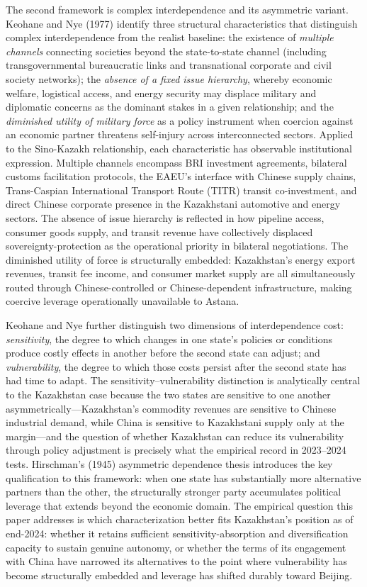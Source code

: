 \documentclass[12pt]{article}
\begin{document}
The second framework is complex interdependence and its asymmetric variant. Keohane and Nye (1977) identify three structural characteristics that distinguish complex interdependence from the realist baseline: the existence of \textit{multiple channels} connecting societies beyond the state-to-state channel (including transgovernmental bureaucratic links and transnational corporate and civil society networks); the \textit{absence of a fixed issue hierarchy}, whereby economic welfare, logistical access, and energy security may displace military and diplomatic concerns as the dominant stakes in a given relationship; and the \textit{diminished utility of military force} as a policy instrument when coercion against an economic partner threatens self-injury across interconnected sectors. Applied to the Sino-Kazakh relationship, each characteristic has observable institutional expression. Multiple channels encompass BRI investment agreements, bilateral customs facilitation protocols, the EAEU's interface with Chinese supply chains, Trans-Caspian International
Transport Route (TITR) transit co-investment, and direct Chinese corporate presence in the Kazakhstani automotive and energy sectors. The absence of issue hierarchy is reflected in how pipeline access, consumer goods supply, and transit revenue have collectively displaced sovereignty-protection as the operational priority in bilateral negotiations. The diminished utility of force is structurally embedded: Kazakhstan's energy export revenues, transit fee income, and consumer market supply are all simultaneously routed through Chinese-controlled or Chinese-dependent infrastructure, making coercive leverage operationally unavailable to Astana.

Keohane and Nye further distinguish two dimensions of interdependence cost: \textit{sensitivity}, the degree to which changes in one state's policies or conditions produce costly effects in another before the second state can adjust; and \textit{vulnerability}, the degree to which those costs persist after the second state has had time to adapt. The sensitivity--vulnerability distinction is analytically central to the Kazakhstan case because the two states are sensitive to one another asymmetrically---Kazakhstan's commodity revenues are sensitive to Chinese industrial demand, while China is sensitive to Kazakhstani supply only at the margin---and the question of whether Kazakhstan can reduce its vulnerability through policy adjustment is precisely what the empirical record in 2023--2024 tests. Hirschman's (1945) asymmetric dependence thesis introduces the key qualification to this framework: when one state has substantially more alternative partners than the other, the structurally stronger party accumulates political leverage that extends beyond the economic domain. The empirical question this paper addresses is which characterization better fits Kazakhstan's position as of end-2024: whether it retains sufficient sensitivity-absorption and diversification capacity to sustain genuine autonomy, or whether the terms of its engagement with China have narrowed its alternatives to the point where vulnerability has become structurally embedded and leverage has shifted durably toward Beijing.
\end{document}
